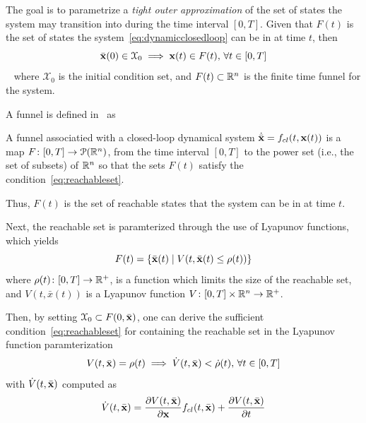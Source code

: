 The goal is to parametrize a \textit{tight outer approximation} of the set of
states the system may transition into during the time interval \([0,T]\). Given
that \(F(t)\) is the set of states the system~\cref{eq:dynamicclosedloop} can be
in at time \(t\), then
\begin{equation}
  \label{eq:reachableset}
  \bar{\mathbf{x}}(0) \in \mathcal{X}_0 \implies \mathbf{x}(t) \in F(t), \, \forall t \in [0,T]
\end{equation}~\cite{majumdarFunnelLibrariesRealtime2017} 
where \(\mathcal{X}_0\) is the initial condition set, and \(F(t) \subset \mathbb{R}^n\)
is the finite time funnel for the system.

A funnel is defined in~\cite[Majumdar]{majumdarFunnelLibrariesRealtime2017} as
\begin{definition}
  \label{def:funnel}
  A funnel associatied with a closed-loop dynamical system
  \(\dot{\bar{\mathbf{x}}} = f_{cl}(t,\mathbf{x}(t))\) is a map \(F \colon [0,T]
  \rightarrow \mathcal{P}(\mathbb{R}^n)\), from the time interval \([0,T]\) to the power
  set (i.e., the set of subsets) of \(\mathbb{R}^n\) so that the sets \(F(t)\) satisfy
  the condition~\cref{eq:reachableset}.
\end{definition}
Thus, \(F(t)\) is the set of reachable states that the system can be in at time
\(t\).

Next, the reachable set is paramterized through the use of Lyapunov functions,
which yields
\begin{equation}
  F(t) = \lbrace\bar{\mathbf{x}}(t) \mid V(t, \bar{\mathbf{x}}(t) \leq \rho (t))\rbrace
\end{equation}
where \(\rho (t) \colon [0,T] \rightarrow \mathbb{R}^+\), is a function which limits the
size of the reachable set, and \(V(t,\bar{x}(t))\) is a Lyapunov function \(V
\colon [0,T] \times \mathbb{R}^n \rightarrow \mathbb{R}^+\).

Then, by setting \(\mathcal{X}_0 \subset F(0,\bar{\mathbf{x}})\), one can derive
the sufficient condition~\cref{eq:reachableset} for containing the reachable set
in the Lyapunov function paramterization
\begin{equation}
  \label{eq:funnelsufficient}
  V(t,\bar{\mathbf{x}}) = \rho(t) \implies \dot{V}(t,\bar{\mathbf{x}}) < \dot{\rho}(t), \, \forall t \in [0,T]
\end{equation}
with \(\dot{V}(t,\bar{\mathbf{x}})\) computed as
\begin{equation}
  \dot{V}(t,\bar{\mathbf{x}}) = \frac{\partial V(t,\bar{\mathbf{x}})}{\partial \mathbf{x}} f_{cl}(t,\bar{\mathbf{x}}) + \frac{\partial V(t,\bar{\mathbf{x}})}{\partial t}
\end{equation}


